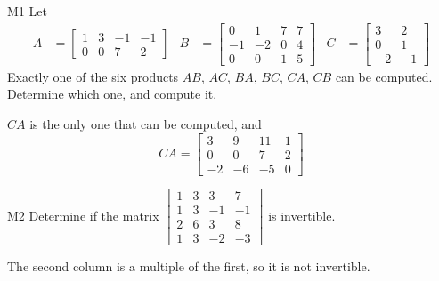 \documentclass{sbgLAsemi}
\begin{document}
\begin{problem}{M1}
Let 
\begin{align*}
A &= \begin{bmatrix} 1 & 3 & -1 & -1 \\ 0 & 0 & 7 & 2 \end{bmatrix} & B &= \begin{bmatrix} 0 & 1 & 7 & 7 \\ -1 & -2 & 0 & 4 \\ 0 & 0 & 1 & 5 \end{bmatrix} & C&=\begin{bmatrix} 3 & 2 \\ 0 & 1 \\ -2 & -1 \end{bmatrix}
\end{align*}
Exactly one of the six products $AB$, $AC$, $BA$, $BC$, $CA$, $CB$ can be computed.  Determine which one, and compute it.
\end{problem}
\begin{solution}
$CA$ is the only one that can be computed, and 
$$CA = \begin{bmatrix} 3 & 9 & 11 & 1 \\ 0 & 0 & 7 & 2 \\ -2 & - 6 & -5 & 0 \end{bmatrix}$$
\end{solution}

\begin{problem}{M2}
Determine if the matrix $\begin{bmatrix} 1 & 3 & 3 & 7 \\ 1 & 3 & -1 & -1 \\ 2 & 6 & 3 & 8 \\ 1 & 3 & -2 & -3 \end{bmatrix}$ is invertible.
\end{problem}
\begin{solution}
The second column is a multiple of the first, so it is not invertible.
\end{solution}
\end{document}
